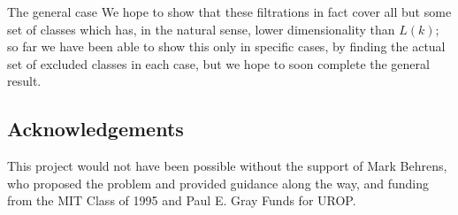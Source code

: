 \documentclass[final]{beamer}
\begin{document}
\begin{columns}[T]
\begin{column}{0.245\textwidth}
\begin{block}{The general case}
        We hope to show that these filtrations in fact cover all but some set of classes which has, in the natural sense, lower dimensionality than $L(k)$; so far we have been able to show this only in specific cases, by finding the actual set of excluded classes in each case, but we hope to soon complete the general result.
      \end{block}
      \subsection{Acknowledgements}

      This project would not have been possible without the support of Mark Behrens, who proposed the problem and provided guidance along the way, and funding from the MIT Class of 1995 and Paul E. Gray Funds for UROP.

    \end{column}
  \end{columns}
\end{document}
